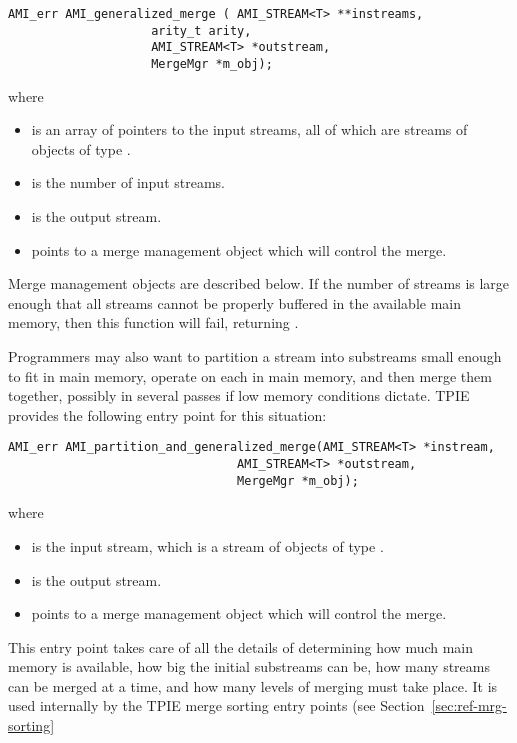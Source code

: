 \begin{verbatim}
AMI_err AMI_generalized_merge ( AMI_STREAM<T> **instreams, 
                    arity_t arity,
                    AMI_STREAM<T> *outstream, 
                    MergeMgr *m_obj);
\end{verbatim}

\noindent
where
\begin{itemize}
    \item {} is an array of pointers to the
    input streams, all of which are streams of objects of
    type .
    \item {} is the number of input streams.
    \item {} is the output stream.
    \item {} points to a merge management
    object which will control the merge.
\end{itemize}

Merge management objects are described below. If the number of
streams is large enough that all streams cannot be properly buffered in the
available main memory, then this function will fail, returning
.

Programmers may also want to partition a stream into
substreams small enough to fit in main memory, operate on
each in main memory, and then merge them together, possibly
in several passes if low memory conditions dictate. TPIE
provides the following entry point for this situation:
\begin{verbatim}
AMI_err AMI_partition_and_generalized_merge(AMI_STREAM<T> *instream,
                                AMI_STREAM<T> *outstream, 
                                MergeMgr *m_obj);
\end{verbatim}
\noindent
where
\begin{itemize}
    \item {} is the
    input stream, which is a stream of objects of
    type .
    \item {} is the output stream.
    \item {} points to a merge management
    object which will control the merge.
\end{itemize}
This entry point takes care of all the details of determining how much
main memory is available, how big the initial substreams can be, how
many streams can be merged at a time, and how many levels of merging
must take place. It is used internally by the TPIE merge
sorting entry points (see Section~\ref{sec:ref-mrg-sorting}

